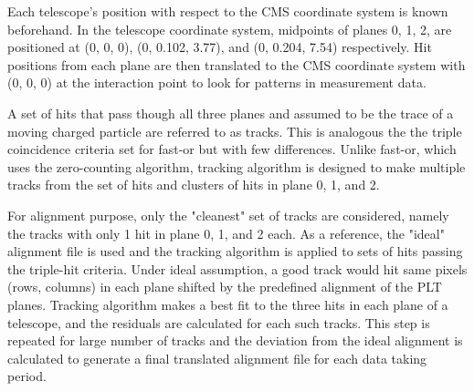Each telescope's position with respect to the CMS coordinate system is known beforehand. In the telescope coordinate system, midpoints of planes 0, 1, 2, are positioned at (0, 0, 0), (0, 0.102, 3.77), and (0, 0.204, 7.54) respectively. Hit positions from each plane are then translated to the CMS coordinate system with (0, 0, 0) at the interaction point to look for patterns in measurement data.


A set of hits that pass though all three planes and assumed to be the trace of a moving charged particle are referred to as tracks. This is analogous the the triple coincidence criteria set for fast-or but with few differences. Unlike fast-or, which uses the zero-counting algorithm, tracking algorithm is designed to make multiple tracks from the set of hits and clusters of hits in plane 0, 1, and 2. 
 
For alignment purpose, only the "cleanest" set of tracks are considered, namely the tracks with only 1 hit in plane 0, 1, and 2 each. As a reference, the "ideal" alignment file is used and the tracking algorithm is applied to sets of hits passing the triple-hit criteria. Under ideal assumption, a good track would hit same pixels (rows, columns) in each plane shifted by the predefined alignment of the PLT planes. Tracking algorithm makes a best fit to the three hits in each plane of a telescope, and the residuals are calculated for each such tracks. This step is repeated for large number of tracks and the deviation from the ideal alignment is calculated to generate a final translated alignment file for each data taking period.





